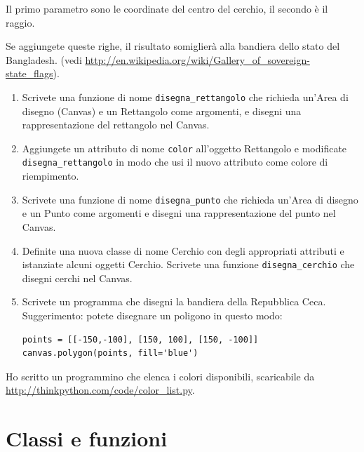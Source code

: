 \documentclass[10pt]{book}
\begin{document}
\begin{exercise}
Il primo parametro sono le coordinate del centro del cerchio, il secondo è il raggio.

Se aggiungete queste righe, il risultato somiglierà alla bandiera dello stato del Bangladesh.
(vedi \url{http://en.wikipedia.org/wiki/Gallery_of_sovereign-state_flags}).

\begin{enumerate}

\item Scrivete una funzione di nome \verb"disegna_rettangolo" che richieda un'Area di disegno (Canvas) e un Rettangolo come argomenti, e disegni una rappresentazione del rettangolo nel Canvas.

\item Aggiungete un attributo di nome {\tt color} all'oggetto Rettangolo e modificate \verb"disegna_rettangolo" in modo che usi il nuovo attributo come colore di riempimento.

\item Scrivete una funzione di nome \verb"disegna_punto" che richieda un'Area di disegno e un Punto come argomenti e disegni una rappresentazione del punto nel Canvas.

\item Definite una nuova classe di nome Cerchio con degli appropriati attributi e istanziate alcuni oggetti Cerchio.  Scrivete una funzione \verb"disegna_cerchio" che disegni cerchi nel Canvas.

\item Scrivete un programma che disegni la bandiera della Repubblica Ceca. Suggerimento: potete disegnare un poligono in questo modo:

\begin{verbatim}
points = [[-150,-100], [150, 100], [150, -100]]
canvas.polygon(points, fill='blue')
\end{verbatim}

\end{enumerate}

Ho scritto un programmino che elenca i colori disponibili, scaricabile da \url{http://thinkpython.com/code/color_list.py}.

\end{exercise}


\chapter{Classi e funzioni}
\label{time}
\end{document}
